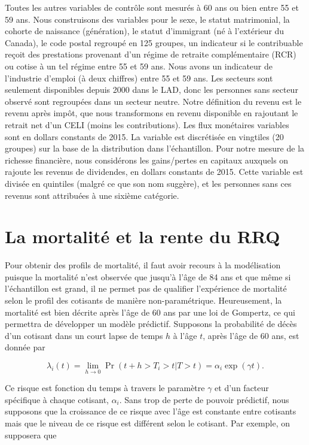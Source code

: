 \documentclass[french, 12pt]{article}
\begin{document}
	Toutes les autres variables de contrôle sont mesurés à 60 ans ou bien entre 55 et 59 ans. Nous construisons des variables pour le sexe, le statut matrimonial, la cohorte de naissance (génération), le statut d'immigrant (né à l'extérieur du Canada), le code postal regroupé en 125 groupes, un indicateur si le contribuable reçoit des prestations provenant d'un régime de retraite complémentaire (RCR) ou cotise à un tel régime entre 55 et 59 ans. Nous avons un indicateur de l'industrie d'emploi (à deux chiffres) entre 55 et 59 ans. Les secteurs sont seulement disponibles depuis 2000 dans le LAD, donc les personnes sans secteur observé sont regroupées dans un secteur neutre. Notre définition du revenu est le revenu après impôt, que nous transformons en revenu disponible en rajoutant le  retrait net d'un CELI (moins les contributions). Les flux monétaires variables sont en dollars constants de 2015. La variable est discrétisée en vingtiles (20 groupes) sur la base de la distribution dans l'échantillon. Pour notre mesure de la richesse financière, nous considérons les gains/pertes en capitaux auxquels on rajoute les revenus de dividendes, en dollars constants de 2015. Cette variable est divisée en quintiles (malgré ce que son nom suggère), et les personnes sans ces revenus sont attribuées à une sixième catégorie. 
	
	
	
	\section{La mortalité et la rente du RRQ}
	
	Pour obtenir des profils de mortalité, il faut avoir recours à la modélisation puisque la mortalité n'est observée que jusqu'à l'âge de 84 ans et que même si l'échantillon est grand, il ne permet pas de qualifier l'expérience de mortalité selon le profil des cotisants de manière non-paramétrique. Heureusement, la mortalité est bien décrite après l'âge de 60 ans par une loi de Gompertz, ce qui permettra de développer un modèle prédictif. Supposons la probabilité de décès d'un cotisant dans un court lapse de temps $h$ à l'âge $t$, après l'âge de 60 ans, est donnée par 
	
	$$ \lambda_i(t) = \lim_{h \to 0} \Pr(t+h>T_i>t|T>t) = \alpha_{i}\exp\left(\gamma t\right). $$
	
	Ce risque est fonction du temps à travers le paramètre $\gamma$ et d'un facteur spécifique à chaque cotisant, $\alpha_i$.  Sans trop de perte de pouvoir prédictif, nous supposons que la croissance de ce risque avec l'âge est constante entre cotisants mais que le niveau de ce risque est différent selon le cotisant. Par exemple, on supposera que 
	
\end{document}
